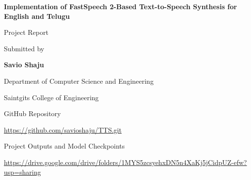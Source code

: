 \documentclass[11pt,a4paper]{article}
\begin{document}
\begin{titlepage}
\begin{center}
\vspace*{1cm}
{\Huge \textbf{Implementation of FastSpeech 2-Based Text-to-Speech Synthesis for English and Telugu}}

\vspace{2cm}
{\Large Project Report}

\vspace{1.5cm}
Submitted by

\vspace{0.5cm}
{\Large \textbf{Savio Shaju}}

\vspace{0.3cm}
\vspace{1.5cm}
Department of Computer Science and Engineering

\vspace{0.3cm}
Saintgits College of Engineering

\vspace{1.5cm}
GitHub Repository

\vspace{0.3cm}
\url{https://github.com/savioshaju/TTS.git}

\vspace{1cm}
Project Outputs and Model Checkpoints

\vspace{0.3cm}
\url{https://drive.google.com/drive/folders/1MYS5zcsyehxDN5n4XaKj5jCidpUZ-efw?usp=sharing}

\vfill
\end{center}
\end{titlepage}

\setcounter{tocdepth}{2}
\tableofcontents
\newpage
{}

\end{document}

